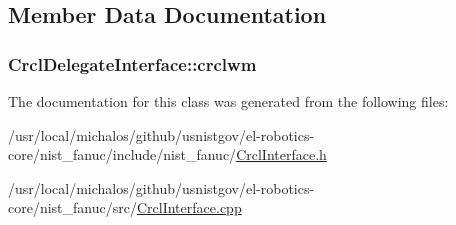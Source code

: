 \subsection{Member Data Documentation}
\hypertarget{classCrcl_1_1CrclDelegateInterface_a18d6ff1b51227f0424f2611804bed4bd}{
\subsubsection[{crclwm}]{ Crcl\-Delegate\-Interface\-::crclwm\hspace{0.3cm}{\ttfamily [static]}}}\label{classCrcl_1_1CrclDelegateInterface_a18d6ff1b51227f0424f2611804bed4bd}


The documentation for this class was generated from the following files\-:\begin{DoxyCompactItemize}
\item 
/usr/local/michalos/github/usnistgov/el-\/robotics-\/core/nist\-\_\-fanuc/include/nist\-\_\-fanuc/\hyperlink{CrclInterface_8h}{Crcl\-Interface.\-h}\item 
/usr/local/michalos/github/usnistgov/el-\/robotics-\/core/nist\-\_\-fanuc/src/\hyperlink{CrclInterface_8cpp}{Crcl\-Interface.\-cpp}\end{DoxyCompactItemize}
